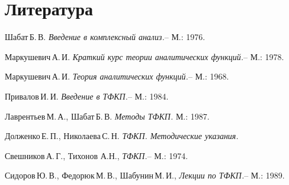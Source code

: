 \documentclass[a4paper]{article}
\begin{document}
\section*{Литература}
\begin{nums}{-3}
\item Шабат\,Б.\,В. \emph{Введение в комплексный анализ.}-- М.: 1976.
\item Маркушевич\,А.\,И. \emph{Краткий курс теории аналитических функций.}-- М.: 1978.
\item Маркушевич\,А.\,И. \emph{Теория аналитических функций.}-- М.: 1968.
\item Привалов\,И.\,И. \emph{Введение в ТФКП.}-- М.: 1984.
\item Лаврентьев\,М.\,А., Шабат\,Б.\,В. \emph{Методы ТФКП.} М.: 1987.
\item Долженко\,Е.\,П., Николаева\,С.\,Н. \emph{ТФКП. Методические указания.}
\item Свешников\,А.\,Г., Тихонов А.Н., \emph{ТФКП.}-- М.: 1974.
\item Сидоров\,Ю.\,В., Федорюк\,М.\,В., Шабунин\,М.\,И., \emph{Лекции по ТФКП.}-- М.: 1989.
\end{nums}

\medskip\dmvntrail
\end{document}

